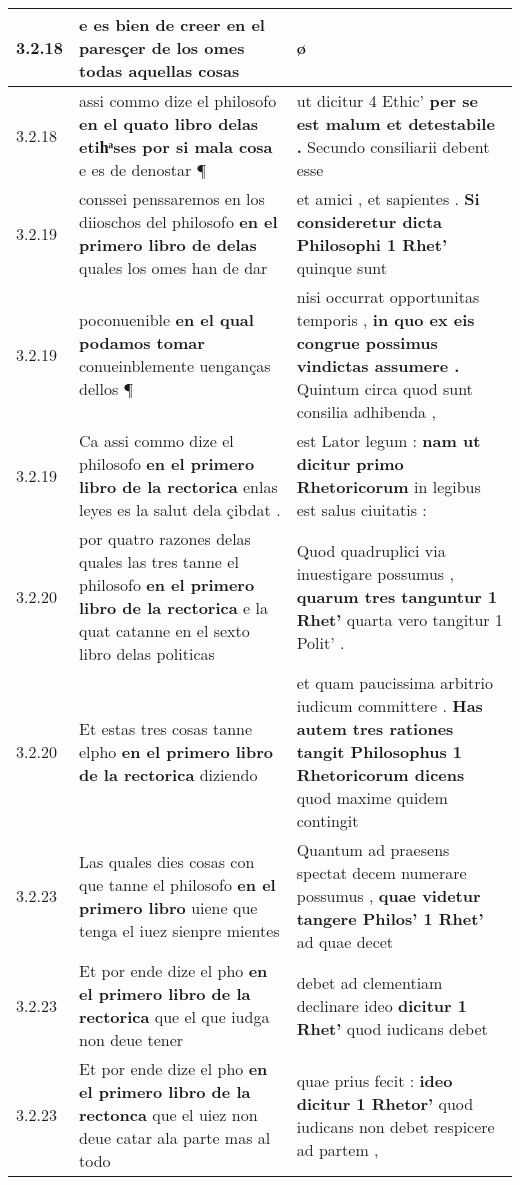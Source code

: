 \begin{tabular}{|p{1cm}|p{6.5cm}|p{6.5cm}|}
3.2.18 & e es bien de creer \textbf{ en el paresçer de los omes } todas aquellas cosas & ø \\\hline
3.2.18 & assi commo dize el philosofo \textbf{ en el quato libro delas etihͣses por si mala cosa } e es de denostar ¶ & ut dicitur 4 Ethic’ \textbf{ per se est malum et detestabile . } Secundo consiliarii debent esse \\\hline
3.2.19 & conssei penssaremos en los diioschos del philosofo \textbf{ en el primero libro de delas } quales los omes han de dar & et amici , et sapientes . \textbf{ Si consideretur dicta Philosophi 1 Rhet’ } quinque sunt \\\hline
3.2.19 & poconuenible \textbf{ en el qual podamos tomar } conueinblemente uenganças dellos ¶ & nisi occurrat opportunitas temporis , \textbf{ in quo ex eis congrue possimus vindictas assumere . } Quintum circa quod sunt consilia adhibenda , \\\hline
3.2.19 & Ca assi commo dize el philosofo \textbf{ en el primero libro de la rectorica } enlas leyes es la salut dela çibdat . & est Lator legum : \textbf{ nam ut dicitur primo Rhetoricorum } in legibus est salus ciuitatis : \\\hline
3.2.20 & por quatro razones delas quales las tres tanne el philosofo \textbf{ en el primero libro de la rectorica } e la quat catanne en el sexto libro delas politicas & Quod quadruplici via inuestigare possumus , \textbf{ quarum tres tanguntur 1 Rhet’ } quarta vero tangitur 1 Polit’ . \\\hline
3.2.20 & Et estas tres cosas tanne elpho \textbf{ en el primero libro de la rectorica } diziendo & et quam paucissima arbitrio iudicum committere . \textbf{ Has autem tres rationes tangit Philosophus 1 Rhetoricorum dicens } quod maxime quidem contingit \\\hline
3.2.23 & Las quales dies cosas con que tanne el philosofo \textbf{ en el primero libro } uiene que tenga el iuez sienpre mientes & Quantum ad praesens spectat decem numerare possumus , \textbf{ quae videtur tangere Philos’ 1 Rhet’ } ad quae decet \\\hline
3.2.23 & Et por ende dize el pho \textbf{ en el primero libro de la rectorica } que el que iudga non deue tener & debet ad clementiam declinare ideo \textbf{ dicitur 1 Rhet’ } quod iudicans debet \\\hline
3.2.23 & Et por ende dize el pho \textbf{ en el primero libro de la rectonca } que el uiez non deue catar ala parte mas al todo & quae prius fecit : \textbf{ ideo dicitur 1 Rhetor’ } quod iudicans non debet respicere ad partem , \\\hline

\end{tabular}
